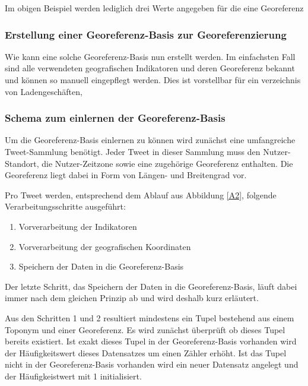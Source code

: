 			Im obigen Beispiel werden lediglich drei Werte angegeben für die eine Georeferenz 

			\subsubsection{Erstellung einer Georeferenz-Basis zur Georeferenzierung}

				Wie kann eine solche Georeferenz-Basis nun erstellt werden.
				Im einfachsten Fall sind alle verwendeten geografischen Indikatoren und deren Georeferenz bekannt und können so manuell eingepflegt werden.
				Dies ist vorstellbar für ein verzeichnis von Ladengeschäften,   

			\subsubsection{Schema zum einlernen der Georeferenz-Basis}



				Um die Georeferenz-Basis einlernen zu können wird zunächst eine umfangreiche Tweet-Sammlung benötigt.
				Jeder Tweet in dieser Sammlung muss den Nutzer-Standort, die Nutzer-Zeitzone sowie eine zugehörige Georeferenz enthalten.
				Die Georeferenz liegt dabei in Form von Längen- und Breitengrad vor. 
				
				Pro Tweet werden, entsprechend dem Ablauf aus Abbildung \ref{A2}, folgende Verarbeitungsschritte ausgeführt:

				\begin{enumerate}
					\item Vorverarbeitung der Indikatoren
					\item Vorverarbeitung der geografischen Koordinaten
					\item Speichern der Daten in die Georeferenz-Basis
				\end{enumerate}

				Der letzte Schritt, das Speichern der Daten in die Georeferenz-Basis, läuft dabei immer nach dem gleichen Prinzip ab und wird deshalb kurz erläutert.
				
				Aus den Schritten 1 und 2 resultiert mindestens ein Tupel bestehend aus einem Toponym und einer Georeferenz. 
				Es wird zunächst überprüft ob dieses Tupel bereits existiert.
				Ist exakt dieses Tupel in der Georeferenz-Basis vorhanden wird der Häufigkeitswert dieses Datensatzes um einen Zähler erhöht.
				Ist das Tupel nicht in der Georeferenz-Basis vorhanden wird ein neuer Datensatz angelegt und der Häufigkeistwert mit 1 initialisiert.

